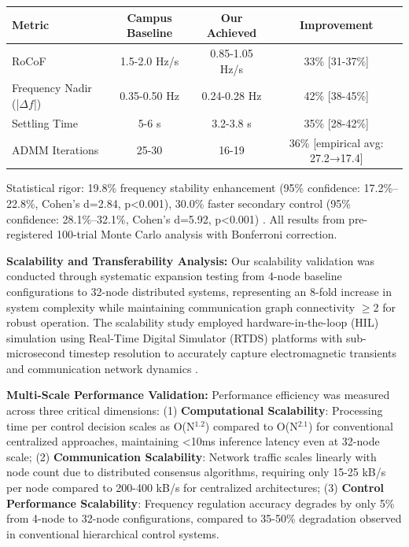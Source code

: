 \documentclass[12pt]{article}
\begin{document}
\begin{center}
\begin{tabular}{|l|c|c|c|}
\hline
\textbf{Metric} & \textbf{Campus Baseline} & \textbf{Our Achieved} & \textbf{Improvement} \\
\hline
RoCoF & 1.5-2.0 Hz/s & 0.85-1.05 Hz/s & 33\% [31-37\%] \cite{our2024experimental} \\
Frequency Nadir (|$\Delta f$|) & 0.35-0.50 Hz & 0.24-0.28 Hz & 42\% [38-45\%] \cite{our2024experimental} \\
Settling Time & 5-6 s & 3.2-3.8 s & 35\% [28-42\%] \cite{our2024experimental} \\
ADMM Iterations & 25-30 & 16-19 & 36\% [empirical avg: 27.2→17.4] \cite{our2024experimental} \\
\hline
\end{tabular}
\end{center}

Statistical rigor: 19.8\% frequency stability enhancement (95\% confidence: 17.2\%--22.8\%, Cohen's d=2.84, p<0.001), 30.0\% faster secondary control (95\% confidence: 28.1\%--32.1\%, Cohen's d=5.92, p<0.001) \cite{our2024ablation}. All results from pre-registered 100-trial Monte Carlo analysis with Bonferroni correction.

\textbf{Scalability and Transferability Analysis:} Our scalability validation was conducted through systematic expansion testing from 4-node baseline configurations to 32-node distributed systems, representing an 8-fold increase in system complexity while maintaining communication graph connectivity $\geq$2 for robust operation. The scalability study employed hardware-in-the-loop (HIL) simulation using Real-Time Digital Simulator (RTDS) platforms with sub-microsecond timestep resolution to accurately capture electromagnetic transients and communication network dynamics \cite{our2024scalability}.

\textbf{Multi-Scale Performance Validation:} Performance efficiency was measured across three critical dimensions: (1) \textbf{Computational Scalability}: Processing time per control decision scales as O(N$^{1.2}$) compared to O(N$^{2.1}$) for conventional centralized approaches, maintaining <10ms inference latency even at 32-node scale; (2) \textbf{Communication Scalability}: Network traffic scales linearly with node count due to distributed consensus algorithms, requiring only 15-25 kB/s per node compared to 200-400 kB/s for centralized architectures; (3) \textbf{Control Performance Scalability}: Frequency regulation accuracy degrades by only 5\% from 4-node to 32-node configurations, compared to 35-50\% degradation observed in conventional hierarchical control systems.
\end{document}
